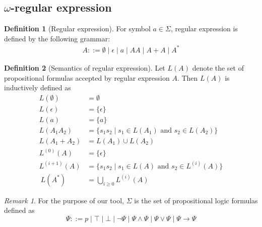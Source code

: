 \documentclass[conference]{IEEEtran}
\theoremstyle{definition}
\newtheorem{definition}{Definition}[section]
\theoremstyle{remark}
\newtheorem{remark}{Remark}[section]
\newcommand{\limplies}{\rightarrow}
\begin{document}
\subsection{$\omega$-regular expression}
\begin{definition}[Regular expression]\label{def:regex}
    For symbol $a \in \Sigma$, regular expression is defined by the following grammar:
    \begin{align*}
        A ::= \emptyset \mid \epsilon \mid a \mid AA \mid A + A \mid A^*
    \end{align*}
\end{definition}
\begin{definition}[Semantics of regular expression]
    Let $L(A)$ denote the set of propositional formulas accepted by regular expression $A$. Then $L(A)$ is inductively defined as
    \begin{align*}
        L(\emptyset) & = \emptyset \\
        L(\epsilon) & = \{\epsilon\} \tag{$\epsilon$ denotes the empty string}\\
        L(a) & = \{a\} \\
        L(A_1A_2) & = \{s_1s_2 \mid s_1 \in L(A_1) \text{ and } s_2 \in L(A_2)\} \\
        L(A_1 + A_2) & = L(A_1) \cup L(A_2) \\
        L^{(0)}(A) & = \{\epsilon\} \\
        L^{(i + 1)}(A) & = \{s_1s_2 \mid s_1 \in L(A) \text{ and } s_2 \in L^{(i)}(A)\} \\\
        L(A^*) & = \bigcup_{i \ge 0} L^{(i)}(A)
    \end{align*}
\end{definition}

\begin{remark}
    For the purpose of our tool, $\Sigma$ is the set of propositional logic formulas defined as
    \[
    \Psi ::= p \mid \top \mid \bot \mid \neg \Psi \mid \Psi \land \Psi \mid \Psi \lor \Psi \mid \Psi \limplies \Psi
    \]
\end{remark}
\end{document}
